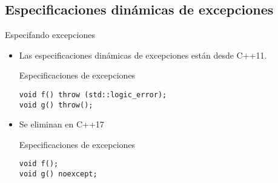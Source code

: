 \subsection{Especificaciones dinámicas de excepciones}

\begin{frame}[t,fragile]{Especifando excepciones}
\begin{itemize}
  \item Las especificaciones dinámicas de excepciones están 
        desde C++11.
\vfill
\begin{block}{Especificaciones de excepciones}
\begin{lstlisting}
void f() throw (std::logic_error);
void g() throw();
\end{lstlisting}
\end{block}
  \vfill\pause
  \item Se eliminan en C++17
\begin{block}{Especificaciones de excepciones}
\begin{lstlisting}
void f();
void g() noexcept;
\end{lstlisting}
\end{block}
\end{itemize}
\end{frame}
